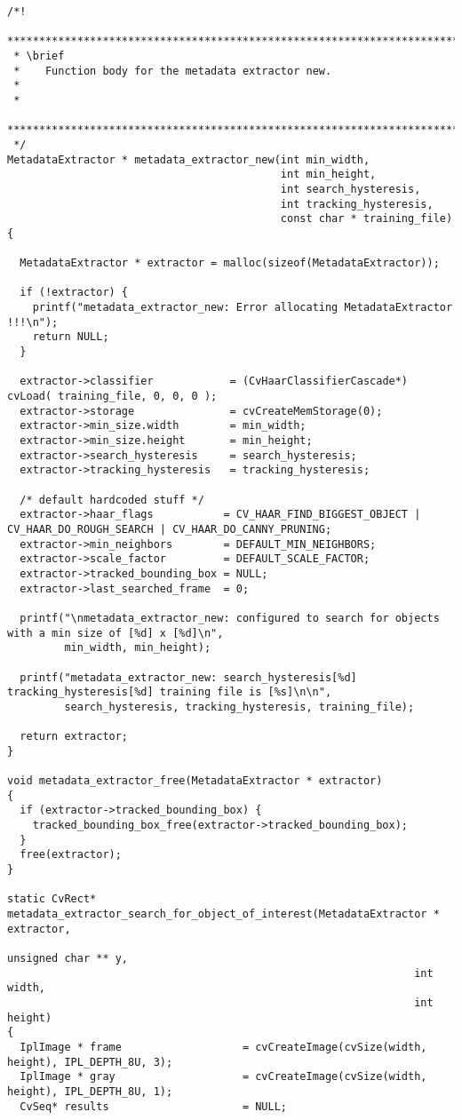 \begin{lstlisting}
/*!
 *************************************************************************************
 * \brief
 *    Function body for the metadata extractor new.
 *
 *
 *************************************************************************************
 */
MetadataExtractor * metadata_extractor_new(int min_width,
                                           int min_height,
                                           int search_hysteresis,
                                           int tracking_hysteresis,
                                           const char * training_file)
{

  MetadataExtractor * extractor = malloc(sizeof(MetadataExtractor));

  if (!extractor) {
    printf("metadata_extractor_new: Error allocating MetadataExtractor !!!\n");
    return NULL;
  }

  extractor->classifier            = (CvHaarClassifierCascade*) cvLoad( training_file, 0, 0, 0 );
  extractor->storage               = cvCreateMemStorage(0);
  extractor->min_size.width        = min_width; 
  extractor->min_size.height       = min_height;
  extractor->search_hysteresis     = search_hysteresis;
  extractor->tracking_hysteresis   = tracking_hysteresis;

  /* default hardcoded stuff */
  extractor->haar_flags           = CV_HAAR_FIND_BIGGEST_OBJECT | CV_HAAR_DO_ROUGH_SEARCH | CV_HAAR_DO_CANNY_PRUNING;
  extractor->min_neighbors        = DEFAULT_MIN_NEIGHBORS;
  extractor->scale_factor         = DEFAULT_SCALE_FACTOR;
  extractor->tracked_bounding_box = NULL;
  extractor->last_searched_frame  = 0;

  printf("\nmetadata_extractor_new: configured to search for objects with a min size of [%d] x [%d]\n", 
         min_width, min_height);

  printf("metadata_extractor_new: search_hysteresis[%d] tracking_hysteresis[%d] training file is [%s]\n\n", 
         search_hysteresis, tracking_hysteresis, training_file);

  return extractor;
}

void metadata_extractor_free(MetadataExtractor * extractor)
{
  if (extractor->tracked_bounding_box) {
    tracked_bounding_box_free(extractor->tracked_bounding_box);
  }
  free(extractor);
}

static CvRect* metadata_extractor_search_for_object_of_interest(MetadataExtractor * extractor, 
                                                                unsigned char ** y, 
                                                                int width, 
                                                                int height)
{
  IplImage * frame                   = cvCreateImage(cvSize(width, height), IPL_DEPTH_8U, 3);
  IplImage * gray                    = cvCreateImage(cvSize(width, height), IPL_DEPTH_8U, 1);
  CvSeq* results                     = NULL;


\end{lstlisting}
